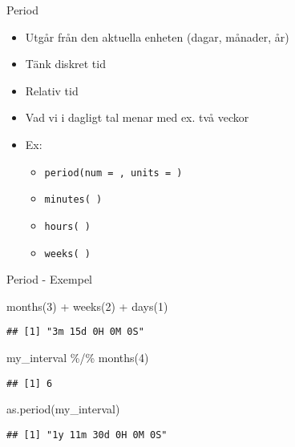 \documentclass[
  11pt,
  ignorenonframetext,
  handout]{beamer}
\newenvironment{Shaded}{\begin{snugshade}}{\end{snugshade}}
\newcommand{\DecValTok}[1]{\textcolor[rgb]{0.00,0.00,0.81}{#1}}
\newcommand{\FunctionTok}[1]{\textcolor[rgb]{0.00,0.00,0.00}{#1}}
\newcommand{\NormalTok}[1]{#1}
\newcommand{\SpecialCharTok}[1]{\textcolor[rgb]{0.00,0.00,0.00}{#1}}
\providecommand{\tightlist}{%
  \setlength{\itemsep}{0pt}\setlength{\parskip}{0pt}}
\begin{document}
\begin{frame}{Period}
\protect\hypertarget{period}{}
\begin{itemize}
\tightlist
\item
  Utgår från den aktuella enheten (dagar, månader, år)
\item
  Tänk diskret tid
\item
  Relativ tid
\item
  Vad vi i dagligt tal menar med ex. två veckor
\item
  Ex:

  \begin{itemize}
  \tightlist
  \item
    \texttt{period(num = , units = )}
  \item
    \texttt{minutes( )}
  \item
    \texttt{hours( )}
  \item
    \texttt{weeks( )}
  \end{itemize}
\end{itemize}
\end{frame}

\begin{frame}[fragile]{Period - Exempel}
\protect\hypertarget{period---exempel}{}
\begin{Shaded}
\begin{Highlighting}[]
\FunctionTok{months}\NormalTok{(}\DecValTok{3}\NormalTok{) }\SpecialCharTok{+} \FunctionTok{weeks}\NormalTok{(}\DecValTok{2}\NormalTok{) }\SpecialCharTok{+} \FunctionTok{days}\NormalTok{(}\DecValTok{1}\NormalTok{)}
\end{Highlighting}
\end{Shaded}

\begin{verbatim}
## [1] "3m 15d 0H 0M 0S"
\end{verbatim}

\begin{Shaded}
\begin{Highlighting}[]
\NormalTok{my\_interval }\SpecialCharTok{\%/\%} \FunctionTok{months}\NormalTok{(}\DecValTok{4}\NormalTok{)}
\end{Highlighting}
\end{Shaded}

\begin{verbatim}
## [1] 6
\end{verbatim}

\begin{Shaded}
\begin{Highlighting}[]
\FunctionTok{as.period}\NormalTok{(my\_interval)}
\end{Highlighting}
\end{Shaded}

\begin{verbatim}
## [1] "1y 11m 30d 0H 0M 0S"
\end{verbatim}
\end{frame}
\end{document}
